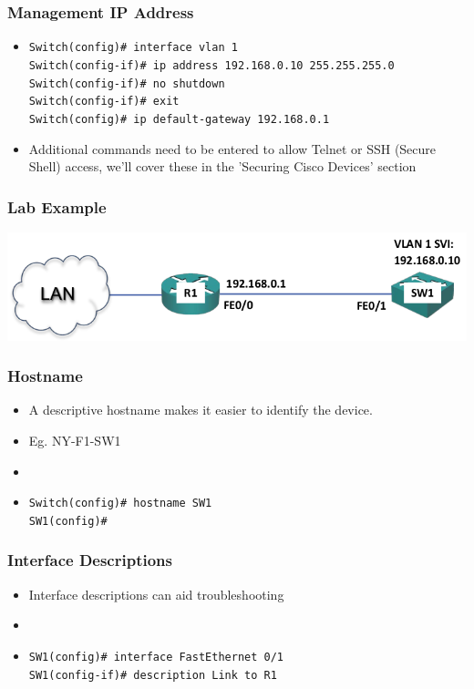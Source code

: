 \documentclass[pdflatex,compress,mathserif]{beamer}
\begin{document}
\begin{frame}
	\frametitle{Management IP Address}
	\begin{itemize}
		\item[] \texttt{\scriptsize Switch(config)\# interface vlan 1 \\
			Switch(config-if)\# ip address 192.168.0.10 255.255.255.0 \\
			Switch(config-if)\# no shutdown \\
			Switch(config-if)\# exit \\
			Switch(config)\# ip default-gateway 192.168.0.1}
		\item Additional commands need to be entered to allow Telnet or SSH (Secure Shell) access, we'll cover these in the 'Securing Cisco Devices' section
	\end{itemize}
\end{frame}

\begin{frame}
	\frametitle{Lab Example}
	\begin{center}
		\includegraphics[width=\linewidth]{img/img02}
	\end{center}
\end{frame}

\begin{frame}
	\frametitle{Hostname}
	\begin{itemize}
		\item A descriptive hostname makes it easier to identify the device.
		\item Eg. NY-F1-SW1
		\item[]
		\item[] \texttt{\scriptsize Switch(config)\# hostname SW1\\
			SW1(config)\#}
	\end{itemize}
\end{frame}

\begin{frame}
	\frametitle{Interface Descriptions}
	\begin{itemize}
		\item Interface descriptions can aid troubleshooting
		\item[]
		\item[] \texttt{\scriptsize SW1(config)\# interface FastEthernet 0/1\\
			SW1(config-if)\# description Link to R1}
	\end{itemize}
\end{frame}
\end{document}
